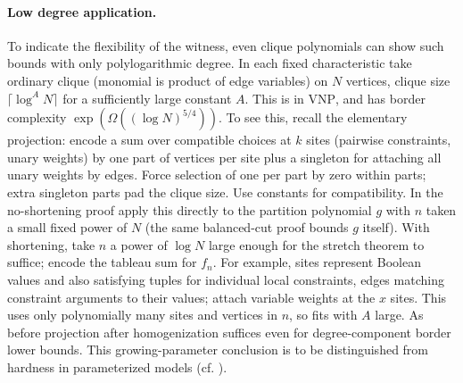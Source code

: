\documentclass[11pt,letterpaper]{article}
\theoremstyle{definition}
\numberwithin{equation}{section}
\begin{document}
\paragraph{Low degree application.}
To indicate the flexibility of the witness, even clique polynomials
can show such bounds with only polylogarithmic degree. In each fixed characteristic take
ordinary clique (monomial is product of edge variables) on $N$ vertices, clique size $\lceil \log^A N\rceil$ for
a sufficiently large constant $A$. This is in $\mathrm{VNP}$, and has border complexity
$\exp(\Omega((\log N)^{5/4}))$.
To see this, recall the elementary projection: encode a sum over compatible choices at $k$
sites (pairwise constraints, unary weights) by one part of vertices per site plus a singleton
for attaching all unary weights by edges. Force selection of one per part by zero within
parts; extra singleton parts pad the clique size. Use constants for compatibility. In the
no-shortening proof apply this directly to the partition polynomial $g$ with $n$ taken a small
fixed power of $N$ (the same balanced-cut proof bounds $g$ itself). With shortening, take $n$ a
power of $\log N$ large enough for the stretch theorem to suffice; encode the tableau sum for
$f_n$. For example, sites represent Boolean values and also satisfying tuples for individual local
constraints, edges matching constraint arguments to their values; attach variable weights
at the $x$ sites. This uses only polynomially many sites and vertices in $n$, so fits with $A$
large. As before projection after homogenization suffices even for degree-component border
lower bounds. This growing-parameter conclusion is to be distinguished from hardness in
parameterized models (cf. \cite{be}).


\end{document}
